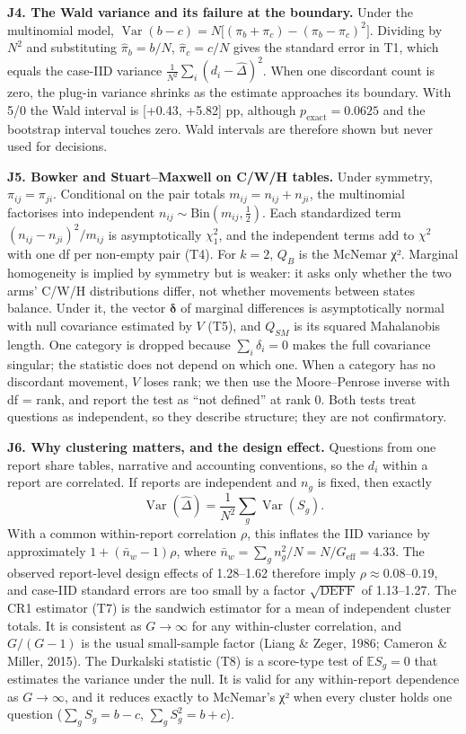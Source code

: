 \documentclass[letterpaper]{article}
\begin{document}
\textbf{J4. The Wald variance and its failure at the boundary.} Under the multinomial model, \(\operatorname{Var}(b-c)=N\big[(\pi_b+\pi_c)-(\pi_b-\pi_c)^2\big]\). Dividing by \(N^2\) and substituting \(\hat\pi_b=b/N\), \(\hat\pi_c=c/N\) gives the standard error in T1, which equals the case-IID variance \(\frac{1}{N^2}\sum_i(d_i-\hat\Delta)^2\). When one discordant count is zero, the plug-in variance shrinks as the estimate approaches its boundary. With 5/0 the Wald interval is {[}+0.43, +5.82{]} pp, although \(p_{\text{exact}}=0.0625\) and the bootstrap interval touches zero. Wald intervals are therefore shown but never used for decisions.

\textbf{J5. Bowker and Stuart--Maxwell on C/W/H tables.} Under symmetry, \(\pi_{ij}=\pi_{ji}\). Conditional on the pair totals \(m_{ij}=n_{ij}+n_{ji}\), the multinomial factorises into independent \(n_{ij}\sim\mathrm{Bin}(m_{ij},\tfrac12)\). Each standardized term \((n_{ij}-n_{ji})^2/m_{ij}\) is asymptotically \(\chi^2_1\), and the independent terms add to \(\chi^2\) with one df per non-empty pair (T4). For \(k=2\), \(Q_B\) is the McNemar χ². Marginal homogeneity is implied by symmetry but is weaker: it asks only whether the two arms' C/W/H distributions differ, not whether movements between states balance. Under it, the vector \(\boldsymbol\delta\) of marginal differences is asymptotically normal with null covariance estimated by \(V\) (T5), and \(Q_{SM}\) is its squared Mahalanobis length. One category is dropped because \(\sum_i\delta_i=0\) makes the full covariance singular; the statistic does not depend on which one. When a category has no discordant movement, \(V\) loses rank; we then use the Moore--Penrose inverse with df = rank, and report the test as ``not defined'' at rank 0. Both tests treat questions as independent, so they describe structure; they are not confirmatory.

\textbf{J6. Why clustering matters, and the design effect.} Questions from one report share tables, narrative and accounting conventions, so the \(d_i\) within a report are correlated. If reports are independent and \(n_g\) is fixed, then exactly \[\operatorname{Var}(\hat\Delta)=\frac{1}{N^2}\sum_g\operatorname{Var}(S_g).\] With a common within-report correlation \(\rho\), this inflates the IID variance by approximately \(1+(\bar n_w-1)\rho\), where \(\bar n_w=\sum_g n_g^2/N=N/G_{\text{eff}}=4.33\). The observed report-level design effects of 1.28--1.62 therefore imply \(\rho\approx0.08\)--\(0.19\), and case-IID standard errors are too small by a factor \(\sqrt{\mathrm{DEFF}}\) of 1.13--1.27. The CR1 estimator (T7) is the sandwich estimator for a mean of independent cluster totals. It is consistent as \(G\to\infty\) for any within-cluster correlation, and \(G/(G-1)\) is the usual small-sample factor (Liang \& Zeger, 1986; Cameron \& Miller, 2015). The Durkalski statistic (T8) is a score-type test of \(\mathbb{E}S_g=0\) that estimates the variance under the null. It is valid for any within-report dependence as \(G\to\infty\), and it reduces exactly to McNemar's χ² when every cluster holds one question (\(\sum_gS_g=b-c\), \(\sum_gS_g^2=b+c\)).
\end{document}
